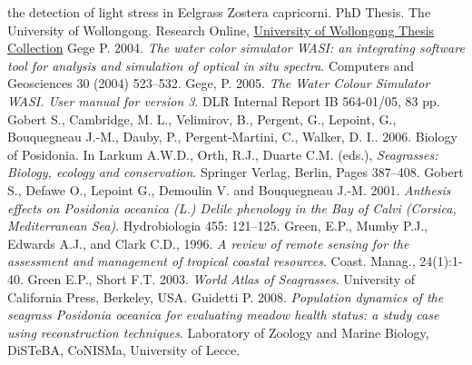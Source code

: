 \documentclass[11pt]{article}
\begin{document}
\begin{thebibliography}{999}
{the detection of light stress in Eelgrass Zostera capricorni. PhD Thesis}. The University of
Wollongong. Research Online, \href{http://ro.uow.edu.au/theses/472/}{University of Wollongong Thesis Collection} \pageref{Fyfe03}
Gege P. 2004. \emph{The water color simulator WASI: an integrating software tool for analysis
and simulation of optical in situ spectra}. Computers and Geosciences 30 (2004) 523–532. \pageref{Gege04}
Gege, P. 2005. \emph{The Water Colour Simulator WASI. User manual for version 3}. DLR
Internal Report IB 564-01/05, 83 pp. \pageref{Gege05}
Gobert S., Cambridge, M. L., Velimirov, B., Pergent, G., Lepoint, G., Bouquegneau J.-M., Dauby, P., Pergent-Martini, C., Walker, D. I.. 2006. Biology of Posidonia. In Larkum A.W.D., Orth, R.J., Duarte C.M. (eds.), \emph{Seagrasses: Biology, ecology and conservation}. Springer Verlag, Berlin, Pages 387–408. \pageref{Gobert06}
Gobert S., Defawe O., Lepoint G., Demoulin V. and Bouquegneau J.-M. 2001. \emph{Anthesis effects on \textit{Posidonia oceanica} (L.) Delile phenology in the Bay of Calvi (Corsica, Mediterranean Sea)}. Hydrobiologia 455: 121–125. \pageref{Gobert01}
Green, E.P., Mumby P.J., Edwards  A.J., and Clark C.D., 1996. \emph{A review of remote sensing for the assessment and management of tropical coastal resources}. Coast. Manag.,
24(1):1-40. \pageref{Green96}
Green E.P., Short F.T. 2003. \emph{World Atlas of Seagrasses}. University of California Press,
Berkeley, USA. \pageref{Green03}
Guidetti P. 2008. \emph{Population dynamics of the seagrass \textit{Posidonia oceanica} for
evaluating meadow health status: a study case using reconstruction techniques}. Laboratory
of Zoology and Marine Biology, DiSTeBA, CoNISMa, University of Lecce. \pageref{Guidetti08}

\end{thebibliography}
\end{document}
